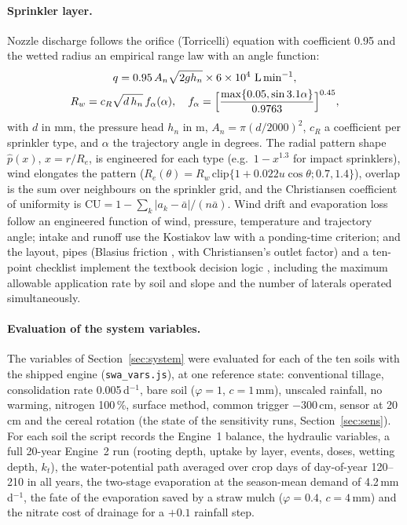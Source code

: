 \documentclass[preprint,12pt]{elsarticle}
\begin{document}
\paragraph{Sprinkler layer.}
\label{sec:sprk}
Nozzle discharge follows the orifice (Torricelli) equation with coefficient 0.95 and the wetted radius an empirical range law \cite{Keller1990} with an angle function:
\begin{equation}
\begin{gathered}q=0.95\,A_n\sqrt{2gh_n}\times6\times10^4\ \mathrm{L\,min^{-1}},\\ R_w=c_R\sqrt{d\,h_n}\,f_\alpha(\alpha),\quad f_\alpha=\Bigl[\frac{\max\{0.05,\sin3.1\alpha\}}{0.9763}\Bigr]^{0.45},\end{gathered}
\label{eq:nozzle}
\end{equation}
with $d$ in mm, the pressure head $h_n$ in m, $A_n=\pi(d/2000)^2$, $c_R$ a coefficient per sprinkler type, and $\alpha$ the trajectory angle in degrees. The radial pattern shape $\hat p(x)$, $x=r/R_e$, is engineered for each type (e.g.\ $1-x^{1.3}$ for impact sprinklers), wind elongates the pattern ($R_e(\theta)=R_w\,\mathrm{clip}\{1+0.022u\cos\theta;0.7,1.4\}$), overlap is the sum over neighbours on the sprinkler grid, and the Christiansen coefficient of uniformity \cite{Christiansen1942} is $\mathrm{CU}=1-\sum_k|a_k-\bar a|/(n\bar a)$. Wind drift and evaporation loss follow an engineered function of wind, pressure, temperature and trajectory angle; intake and runoff use the Kostiakov law with a ponding-time criterion; and the layout, pipes (Blasius friction \cite{Blasius1913}, with Christiansen's outlet factor) and a ten-point checklist implement the textbook decision logic \cite{Keller1990}, including the maximum allowable application rate by soil and slope and the number of laterals operated simultaneously.

\paragraph{Evaluation of the system variables.}
\label{sec:swamethods}
The variables of Section~\ref{sec:system} were evaluated for each of the ten soils with the shipped engine (\texttt{swa\_vars.js}), at one reference state: conventional tillage, consolidation rate 0.005\,d$^{-1}$, bare soil ($\varphi=1$, $c=1$\,mm), unscaled rainfall, no warming, nitrogen 100\,\%, surface method, common trigger $-300$\,cm, sensor at 20\,cm and the cereal rotation (the state of the sensitivity runs, Section~\ref{sec:sens}). For each soil the script records the Engine~1 balance, the hydraulic variables, a full 20-year Engine~2 run (rooting depth, uptake by layer, events, doses, wetting depth, $k_t$), the water-potential path averaged over crop days of day-of-year 120--210 in all years, the two-stage evaporation at the season-mean demand of 4.2\,mm\,d$^{-1}$, the fate of the evaporation saved by a straw mulch ($\varphi=0.4$, $c=4$\,mm) and the nitrate cost of drainage for a $+0.1$ rainfall step.
\end{document}
